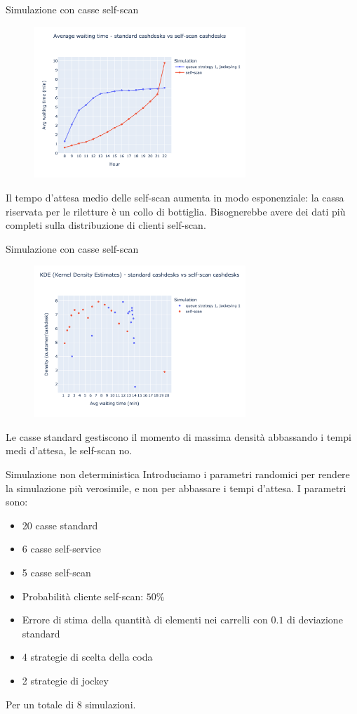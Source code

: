 \begin{frame}{Simulazione con casse self-scan}
	\begin{figure}[H]
		\centering
		\includegraphics[width=8cm]{"../report/images/results/avg_wt_selfscan.png"}
	\end{figure}
	Il tempo d'attesa medio delle self-scan aumenta in modo esponenziale: la cassa riservata per le riletture è un collo di bottiglia. Bisognerebbe avere dei dati più completi sulla distribuzione di clienti self-scan.
\end{frame}

\begin{frame}{Simulazione con casse self-scan}
	\begin{figure}[H]
		\centering
		\includegraphics[width=8cm]{"../report/images/results/kde_self_scan.png"}
	\end{figure}
	Le casse standard gestiscono il momento di massima densità abbassando i tempi medi d'attesa, le self-scan no.
\end{frame}

\begin{frame}{Simulazione non deterministica}
	Introduciamo i parametri randomici per rendere la simulazione più verosimile, e non per abbassare i tempi d'attesa. I parametri sono:
	\begin{itemize}
		\item 20 casse standard
		\item 6 casse self-service
		\item 5 casse self-scan
		\item Probabilità cliente self-scan: $50 \%$
		\item Errore di stima della quantità di elementi nei carrelli con $0.1$ di deviazione standard
		\item 4 strategie di scelta della coda
		\item 2 strategie di jockey
	\end{itemize}
	Per un totale di 8 simulazioni.
\end{frame}

